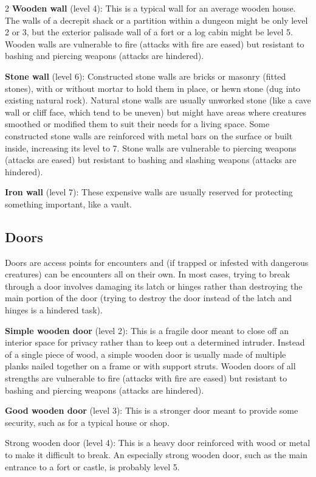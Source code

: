 \begin{multicols}{2}
\textbf{Wooden wall} (level 4): This is a typical wall for an average wooden house. The walls of a decrepit shack or a partition within a dungeon might be only level 2 or 3, but the exterior palisade wall of a fort or a log cabin might be level 5. Wooden walls are vulnerable to fire (attacks with fire are eased) but resistant to bashing and piercing weapons (attacks are hindered). 

\textbf{Stone wall} (level 6): Constructed stone walls are bricks or masonry (fitted stones), with or without mortar to hold them in place, or hewn stone (dug into existing natural rock). Natural stone walls are usually unworked stone (like a cave wall or cliff face, which tend to be uneven) but might have areas where creatures smoothed or modified them to suit their needs for a living space. Some constructed stone walls are reinforced with metal bars on the surface or built inside, increasing its level to 7. Stone walls are vulnerable to piercing weapons (attacks are eased) but resistant to bashing and slashing weapons (attacks are hindered). 

\textbf{Iron wall} (level 7): These expensive walls are usually reserved for protecting something important, like a vault.

\subsection{Doors}

Doors are access points for encounters and (if trapped or infested with dangerous creatures) can be encounters all on their own. In most cases, trying to break through a door involves damaging its latch or hinges rather than destroying the main portion of the door (trying to destroy the door instead of the latch and hinges is a hindered task). 

\textbf{Simple wooden door} (level 2): This is a fragile door meant to close off an interior space for privacy rather than to keep out a determined intruder. Instead of a single piece of wood, a simple wooden door is usually made of multiple planks nailed together on a frame or with support struts. Wooden doors of all strengths are vulnerable to fire (attacks with fire are eased) but resistant to bashing and piercing weapons (attacks are hindered). 

\textbf{Good wooden door} (level 3): This is a stronger door meant to provide some security, such as for a typical house or shop. 

Strong wooden door (level 4): This is a heavy door reinforced with wood or metal to make it difficult to break. An especially strong wooden door, such as the main entrance to a fort or castle, is probably level 5. 


\end{multicols}
